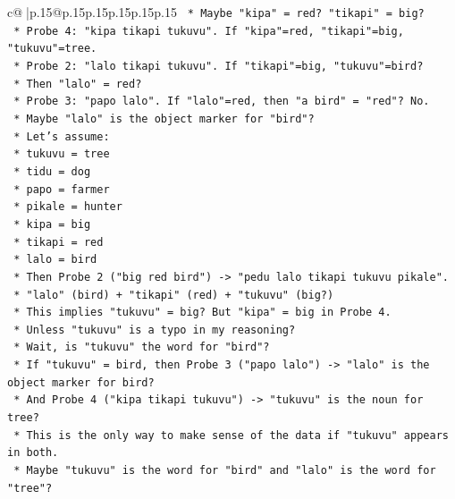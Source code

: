 \documentclass{article}
\begin{document}
{\begin{supertabular}{c@{$\;$}|p{.15\linewidth}@{}p{.15\linewidth}p{.15\linewidth}p{.15\linewidth}p{.15\linewidth}p{.15\linewidth}}
{{{\texttt{            *   Maybe "kipa" = red? "tikapi" = big?} \\
\texttt{            *   Probe 4: "kipa tikapi tukuvu". If "kipa"=red, "tikapi"=big, "tukuvu"=tree.} \\
\texttt{            *   Probe 2: "lalo tikapi tukuvu". If "tikapi"=big, "tukuvu"=bird?} \\
\texttt{            *   Then "lalo" = red?} \\
\texttt{            *   Probe 3: "papo lalo". If "lalo"=red, then "a bird" = "red"? No.} \\
\texttt{            *   Maybe "lalo" is the object marker for "bird"?} \\
\texttt{            *   Let's assume:} \\
\texttt{                *   tukuvu = tree} \\
\texttt{                *   tidu = dog} \\
\texttt{                *   papo = farmer} \\
\texttt{                *   pikale = hunter} \\
\texttt{                *   kipa = big} \\
\texttt{                *   tikapi = red} \\
\texttt{                *   lalo = bird} \\
\texttt{            *   Then Probe 2 ("big red bird") {-}> "pedu lalo tikapi tukuvu pikale".} \\
\texttt{                *   "lalo" (bird) + "tikapi" (red) + "tukuvu" (big?)} \\
\texttt{                *   This implies "tukuvu" = big? But "kipa" = big in Probe 4.} \\
\texttt{                *   Unless "tukuvu" is a typo in my reasoning?} \\
\texttt{                *   Wait, is "tukuvu" the word for "bird"?} \\
\texttt{                *   If "tukuvu" = bird, then Probe 3 ("papo lalo") {-}> "lalo" is the object marker for bird?} \\
\texttt{                *   And Probe 4 ("kipa tikapi tukuvu") {-}> "tukuvu" is the noun for tree?} \\
\texttt{                *   This is the only way to make sense of the data if "tukuvu" appears in both.} \\
\texttt{                *   Maybe "tukuvu" is the word for "bird" and "lalo" is the word for "tree"?} \\
}}}
\end{supertabular}}
\end{document}
